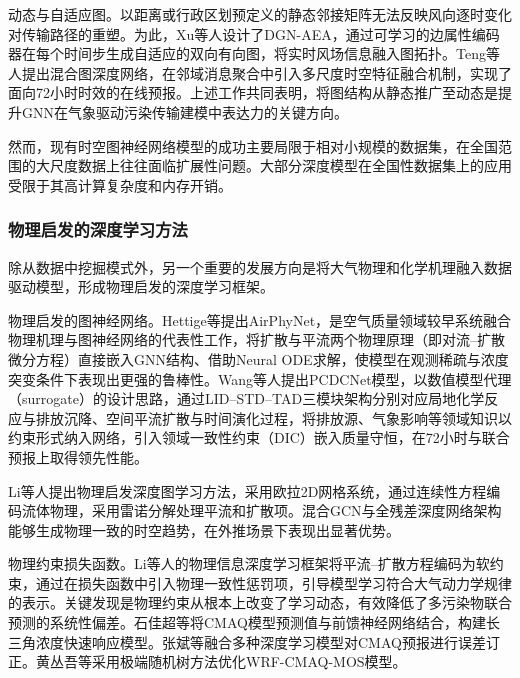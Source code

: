 动态与自适应图。以距离或行政区划预定义的静态邻接矩阵无法反映风向逐时变化对传输路径的重塑。为此，Xu等人\citep{xu2023dynamic}设计了DGN-AEA，通过可学习的边属性编码器在每个时间步生成自适应的双向有向图，将实时风场信息融入图拓扑。Teng等人\citep{teng202372,teng2024new}提出混合图深度网络，在邻域消息聚合中引入多尺度时空特征融合机制，实现了面向72小时时效的在线预报。上述工作共同表明，将图结构从静态推广至动态是提升GNN在气象驱动污染传输建模中表达力的关键方向。

然而，现有时空图神经网络模型的成功主要局限于相对小规模的数据集，在全国范围的大尺度数据上往往面临扩展性问题。大部分深度模型在全国性数据集上的应用受限于其高计算复杂度和内存开销。

\subsubsection{物理启发的深度学习方法}

除从数据中挖掘模式外，另一个重要的发展方向是将大气物理和化学机理融入数据驱动模型，形成物理启发的深度学习框架\citep{reichstein2019deep,raissi2019physics,cn_zhawenshu2022pinn}。

物理启发的图神经网络。Hettige等\citep{hettigeairphynet}提出AirPhyNet，是空气质量领域较早系统融合物理机理与图神经网络的代表性工作，将扩散与平流两个物理原理（即对流--扩散微分方程）直接嵌入GNN结构、借助Neural ODE求解，使模型在观测稀疏与浓度突变条件下表现出更强的鲁棒性。Wang等人\citep{wang2025pcdcnet}提出PCDCNet模型，以数值模型代理（surrogate）的设计思路，通过LID--STD--TAD三模块架构分别对应局地化学反应与排放沉降、空间平流扩散与时间演化过程，将排放源、气象影响等领域知识以约束形式纳入网络，引入领域一致性约束（DIC）嵌入质量守恒，在72小时\PM 与\ozone 联合预报上取得领先性能。

Li等人\citep{li2023improving}提出物理启发深度图学习方法，采用欧拉2D网格系统，通过连续性方程编码流体物理，采用雷诺分解处理平流和扩散项。混合GCN与全残差深度网络架构能够生成物理一致的时空趋势，在外推场景下表现出显著优势。

物理约束损失函数。Li等人\citep{li2025knowledge}的物理信息深度学习框架将平流--扩散方程编码为软约束，通过在损失函数中引入物理一致性惩罚项，引导模型学习符合大气动力学规律的表示。关键发现是物理约束从根本上改变了学习动态，有效降低了多污染物联合预测的系统性偏差。石佳超等\citep{cn_shijiachao2018cmaqnn}将CMAQ模型预测值与前馈神经网络结合，构建长三角\PM{}浓度快速响应模型。张斌等\citep{cn_zhangbin2020jicheng}融合多种深度学习模型对CMAQ预报进行误差订正。黄丛吾等\citep{cn_huangcongwu2018mos}采用极端随机树方法优化WRF-CMAQ-MOS模型。

